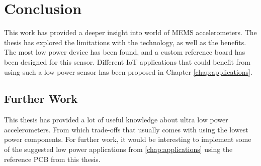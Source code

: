 \chapter{Conclusion}

This work has provided a deeper insight into world of MEMS accelerometers. The thesis has explored the limitations with the technology, as well as the benefits. The most low power device has been found, and a custom reference board has been designed for this sensor. Different IoT applications that could benefit from using such a low power sensor has been proposed in Chapter \ref{chap:applications}. 

\section{Further Work}

This thesis has provided a lot of useful knowledge about ultra low power accelerometers. From which trade-offs that usually comes with using the lowest power components. For further work, it would be interesting to implement some of the suggested low power applications from \ref{chap:applications} using the reference PCB from this thesis.
